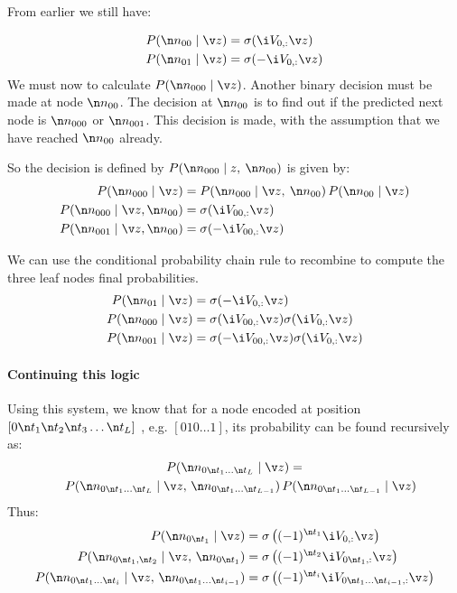 {From earlier we still have:

\begin{align}
P(\n n_{00}\mid \v z)&=\sigma(\i V_{0,:}\v z)\\
P(\n n_{01}\mid \v z)&=\sigma(-\i V_{0,:}\v z)
\end{align}
We must now to calculate $P(\n n_{000}\mid \v z)$.
Another  binary decision must be made at node $\n n_{00}$.
The decision at $\n n_{00}$ is to find out if the predicted next node is $\n n_{000}$ or $\n n_{001}$.
This decision is made, with the assumption that we have reached $\n n_{00}$ already.

So the decision is defined by $P(\n n_{000}\mid z,\:\n n_{00})$
is given by:
\begin{align}
P(\n n_{000}\mid \v z)&=P(\n n_{000}\mid \v z,\:\n n_{00})\,P(\n n_{00}\mid \v z) \\
P(\n n_{000}\mid \v z,\n n_{00})&=\sigma(\i V_{00,:}\v z) \\
P(\n n_{001}\mid \v z,\n n_{00})&=\sigma(-\i V_{00,:}\v z)
\end{align}

We can use the conditional probability chain rule to recombine
to compute the three leaf nodes final probabilities.
\begin{align}
P(\n n_{01}\mid \v z)&=\sigma(-\i V_{0,:}\v z) \\
P(\n n_{000}\mid \v z)&=\sigma(\i V_{00,:}\v z)\sigma(\i V_{0,:}\v z) \\
P(\n n_{001}\mid \v z)&=\sigma(-\i V_{00,:}\v z)\sigma(\i V_{0,:} \v z)
\end{align}

\paragraph{Continuing this logic}

Using this system,
we know that for a node encoded at position $[0\n t_{1}\n t_{2}\n t_{3}\ldots\n t_{L}]$
, e.g. $[010\ldots1]$,
its probability can be found recursively as: 
\begin{multline}
P(\n n_{0\n t_{1}\ldots\n t_{L}}\mid \v z) =\\
\quad P(\n n_{0\n t_{1}\ldots\n t_{L}}\mid \v z,\,\n n_{0\n t_{1}\ldots\n t_{L-1}})\,P(\n n_{0\n t_{1}\ldots\n t_{L-1}}\mid \v z)
\end{multline}
Thus:
\begin{align}
%
P(\n n_{0\n t_{1}}\mid \v z)&=\sigma\left((-1)^{\n t_{1}}\i V_{0,:} \v z\right)\\
%
P(\n n_{0\n t_{1},\n t_{2}}\mid \v z,\,\n n_{0\n t_{1}})&=\sigma\left((-1)^{\n t_{2}} \i V_{0\n t_{1}, :} \v z\right)\\
%
P(\n n_{0\n t_{1}\ldots\n t_{i}}\mid \v z,\,\n n_{0\n t_{1}\ldots\n t_{i-1}})&=\sigma\left((-1)^{\n t_{i}} \i V_{0\n t_{1}\ldots\n t_{i-1}, :} \v z\right)
\end{align}

}
